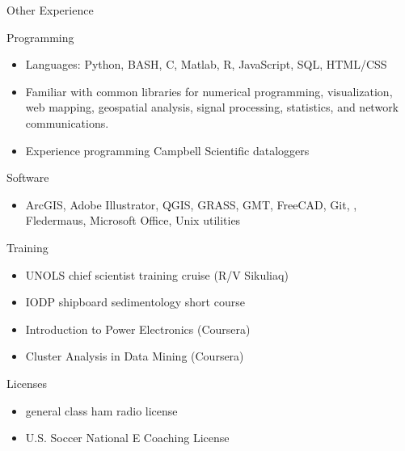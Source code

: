 \begin{cvlist}{Other Experience}
\item[Programming]
    \begin{itemize}
        \item Languages: Python, BASH, C, Matlab, R, JavaScript, SQL, HTML/CSS
        \item Familiar with common libraries for numerical programming, visualization,
            web mapping, geospatial analysis, signal processing, statistics, and network communications. 
        \item Experience programming Campbell Scientific dataloggers
    \end{itemize}

\item[Software]
    \begin{itemize}
        \item ArcGIS, Adobe Illustrator, QGIS,  GRASS, GMT, FreeCAD, Git, \LaTex, Fledermaus, Microsoft Office, Unix utilities
    \end{itemize}

\item[Training] 
    \begin{itemize}
        \item UNOLS chief scientist training cruise (R/V Sikuliaq)
        \item IODP shipboard sedimentology short course
        \item Introduction to Power Electronics (Coursera)
        \item Cluster Analysis in Data Mining (Coursera)
    \end{itemize}

\item[Licenses]
    \begin{itemize}
        \item general class ham radio license
        \item U.S. Soccer National E Coaching License 
    \end{itemize}
\end{cvlist}
